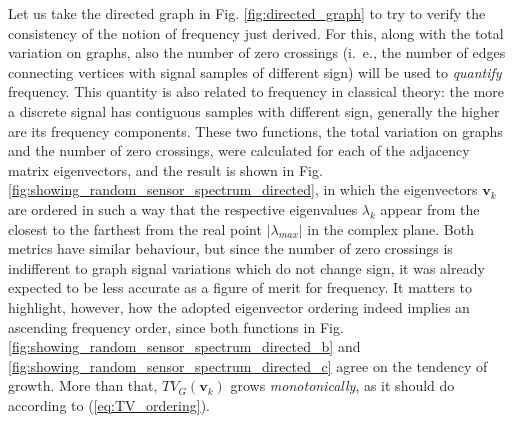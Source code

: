 Let us take the directed graph in Fig. \ref{fig:directed_graph} to try to verify the consistency of the notion of frequency just derived. For this, along with the total variation on graphs, also the number of zero crossings (i.~e., the number of edges connecting vertices with signal samples of different sign) will be used to \emph{quantify} frequency. This quantity is also related to frequency in classical theory: the more a discrete signal has contiguous samples with different sign, generally the higher are its frequency components. These two functions, the total variation on graphs and the number of zero crossings, were calculated for each of the adjacency matrix eigenvectors, and the result is shown in Fig. \ref{fig:showing_random_sensor_spectrum_directed}, in which the eigenvectors $ \mathbf{v}_k $ are ordered in such a way that the respective eigenvalues $ \lambda_k $ appear from the closest to the farthest from the real point $ |\lambda_{max}| $ in the complex plane. Both metrics have similar behaviour, but since the number of zero crossings is indifferent to graph signal variations which do not change sign, it was already expected to be less accurate as a figure of merit for frequency. It matters to highlight, however, how the adopted eigenvector ordering indeed implies an ascending frequency order, since both functions in Fig. \ref{fig:showing_random_sensor_spectrum_directed_b} and \ref{fig:showing_random_sensor_spectrum_directed_c} agree on the tendency of growth. More than that, $ TV_G(\mathbf{v}_k) $ grows \emph{monotonically}, as it should do according to (\ref{eq:TV_ordering}).


